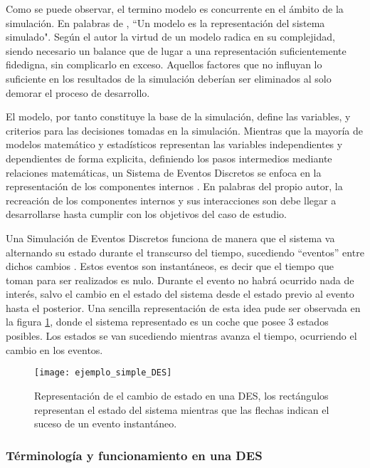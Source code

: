 Como se puede observar, el termino modelo es concurrente en el ámbito de la simulación. En palabras de \citep{banks1998handbook}, ``Un modelo es la representación del sistema simulado". Según el autor la virtud de un modelo radica en su complejidad, siendo necesario un balance que de lugar a una representación suficientemente fidedigna, sin complicarlo en exceso. Aquellos factores que no influyan lo suficiente en los resultados de la simulación deberían ser eliminados al solo demorar el proceso de desarrollo.

El modelo, por tanto constituye la base de la simulación, define las variables, y criterios para las decisiones tomadas en la simulación. Mientras que la mayoría de modelos matemático y estadísticos representan las variables independientes y dependientes de forma explicita, definiendo los pasos intermedios mediante relaciones matemáticas, un Sistema de Eventos Discretos se enfoca en la representación de los componentes internos \citep{banks1998handbook}. En palabras del propio autor, la recreación de los componentes internos y sus interacciones son debe llegar a desarrollarse hasta cumplir con los objetivos del caso de estudio.

Una Simulación de Eventos Discretos funciona de manera que el sistema va alternando su estado durante el transcurso del tiempo, sucediendo ``eventos'' entre dichos cambios \citep{varga2001discrete}. Estos eventos son instantáneos, es decir que el tiempo que toman para ser realizados es nulo. Durante el evento no habrá ocurrido nada de interés, salvo el cambio en el estado del sistema desde el estado previo al evento hasta el posterior. Una sencilla representación de esta idea pude ser observada en la figura \ref{fig:diagrama_basico_DES}, donde el sistema representado es un coche que posee 3 estados posibles. Los estados se van sucediendo mientras avanza el tiempo, ocurriendo el cambio en los eventos.

\begin{figure}[h]
    \begin{center}
        \texttt{[image: ejemplo\_simple\_DES]}    
    \end{center}
    \caption{Representación de el cambio de estado en una DES, los rectángulos representan el estado del sistema mientras que las flechas indican el suceso de un evento instantáneo.}
    \label{fig:diagrama_basico_DES}
\end{figure}

\subsubsection{Términología y funcionamiento en una DES}\label{TF_DES}

